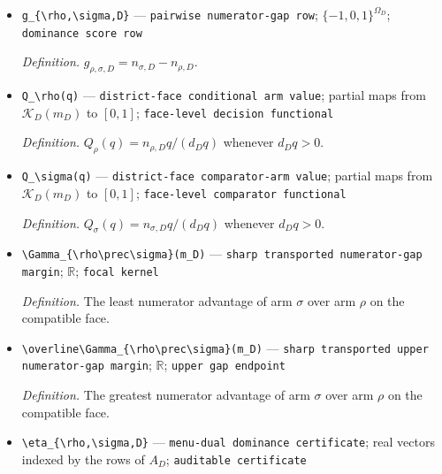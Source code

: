 \documentclass{article}
\begin{document}
\begin{itemize}
  \par\smallskip\noindent\emph{Definition.} The target district row for \(E\).
  \item \texttt{g\_\allowbreak{}\{\textbackslash{}\allowbreak{}rho,\allowbreak{}\textbackslash{}\allowbreak{}sigma,\allowbreak{}D\}\allowbreak{}} --- \texttt{pairwise numerator-\allowbreak{}gap row}; \(\{-1,0,1\}^{\Omega_D}\); \texttt{dominance score row}
  \par\smallskip\noindent\emph{Definition.} \(g_{\rho,\sigma,D}=n_{\sigma,D}-n_{\rho,D}\).
  \item \texttt{Q\_\allowbreak{}\textbackslash{}\allowbreak{}rho(q)} --- \texttt{district-\allowbreak{}face conditional arm value}; partial maps from \(\mathcal K_D(m_D)\) to \([0,1]\); \texttt{face-\allowbreak{}level decision functional}
  \par\smallskip\noindent\emph{Definition.} \(Q_\rho(q)=n_{\rho,D}q/(d_Dq)\) whenever \(d_Dq>0\).
  \item \texttt{Q\_\allowbreak{}\textbackslash{}\allowbreak{}sigma(q)} --- \texttt{district-\allowbreak{}face comparator-\allowbreak{}arm value}; partial maps from \(\mathcal K_D(m_D)\) to \([0,1]\); \texttt{face-\allowbreak{}level comparator functional}
  \par\smallskip\noindent\emph{Definition.} \(Q_\sigma(q)=n_{\sigma,D}q/(d_Dq)\) whenever \(d_Dq>0\).
  \item \texttt{\textbackslash{}\allowbreak{}Gamma\_\allowbreak{}\{\textbackslash{}\allowbreak{}rho\textbackslash{}\allowbreak{}prec\textbackslash{}\allowbreak{}sigma\}\allowbreak{}(m\_\allowbreak{}D)} --- \texttt{sharp transported numerator-\allowbreak{}gap margin}; \(\mathbb R\); \texttt{focal kernel}
  \par\smallskip\noindent\emph{Definition.} The least numerator advantage of arm \(\sigma\) over arm \(\rho\) on the compatible face.
  \item \texttt{\textbackslash{}\allowbreak{}overline\textbackslash{}\allowbreak{}Gamma\_\allowbreak{}\{\textbackslash{}\allowbreak{}rho\textbackslash{}\allowbreak{}prec\textbackslash{}\allowbreak{}sigma\}\allowbreak{}(m\_\allowbreak{}D)} --- \texttt{sharp transported upper numerator-\allowbreak{}gap margin}; \(\mathbb R\); \texttt{upper gap endpoint}
  \par\smallskip\noindent\emph{Definition.} The greatest numerator advantage of arm \(\sigma\) over arm \(\rho\) on the compatible face.
  \item \texttt{\textbackslash{}\allowbreak{}eta\_\allowbreak{}\{\textbackslash{}\allowbreak{}rho,\allowbreak{}\textbackslash{}\allowbreak{}sigma,\allowbreak{}D\}\allowbreak{}} --- \texttt{menu-\allowbreak{}dual dominance certificate}; real vectors indexed by the rows of \(A_D\); \texttt{auditable certificate}

\end{itemize}
\end{document}
